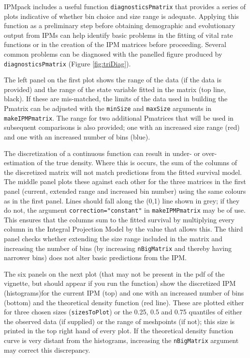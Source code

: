 \documentclass{article}
\begin{document}
IPMpack includes a useful function {\tt diagnosticsPmatrix} that provides a
series of plots indicative of whether bin choice and size range is adequate.
Applying this function as a preliminary step before obtaining demographic and evolutionary output from IPMs can help identify basic problems in the fitting of vital rate functions or in the creation of the IPM matrices before proceeding. Several common problems can be diagnosed with the panelled figure produced by {\tt diagnosticsPmatrix} (Figure
\ref{fig:triDiag}).

The left panel on the first plot shows the range of the data (if the data is provided) and the range of the state variable fitted in the matrix (top line, black).  If these are mis-matched, the limits of the data used in building the Pmatrix can be adjusted with the {\tt minSize} and {\tt maxSize} arguments in {\tt makeIPMPmatrix}.  The range for two additional Pmatrices that will be used in subsequent comparisons is also provided; one with an increased size range (red) and one with an increased number of bins (blue). 

The discretization of a continuous function can result in under- or over-estimation of the true density. Where this is occurs, the sum of the columns of the discretized matrix will not match predictions from the fitted survival model.  The middle panel 
plots these against each other for the three matrices in the first panel (current, extended range and increased bin number) using the same colours as in the first panel. Lines should fall along the (0,1) line shown in grey; if they do not, the argument {\tt correction="constant"} in {\tt makeIPMPmatrix} may be of use. This ensures that the columns sum to the fitted survival by multiplying every column in the Integral Projection Model by the value that allows this. The third panel checks whether extending the size range included in the matrix and increasing the number of bins (by increasing {\tt nBigMatrix} and thereby having narrower bins) does not alter basic predictions from the IPM.

The six panels on the next plot (that may not be present in the pdf of the vignette, but should appear if you run the function) show the discretized IPM (histograms)for the current IPM (top) and one with an increased number of bins (bottom)  and the
theoretical density function (red line). These are plotted either for three chosen sizes ({\tt sizesToPlot}) or the 0.25, 0.5 and 0.75 quantiles of either the observed data (if supplied) or the range of meshpoints (if not); this size is printed in the top right hand of every plot. If the theoretical density function curve is very distant from the histograms, increasing the {\tt nBigMatrix} argument may correct this discrepancy. 
\end{document}
